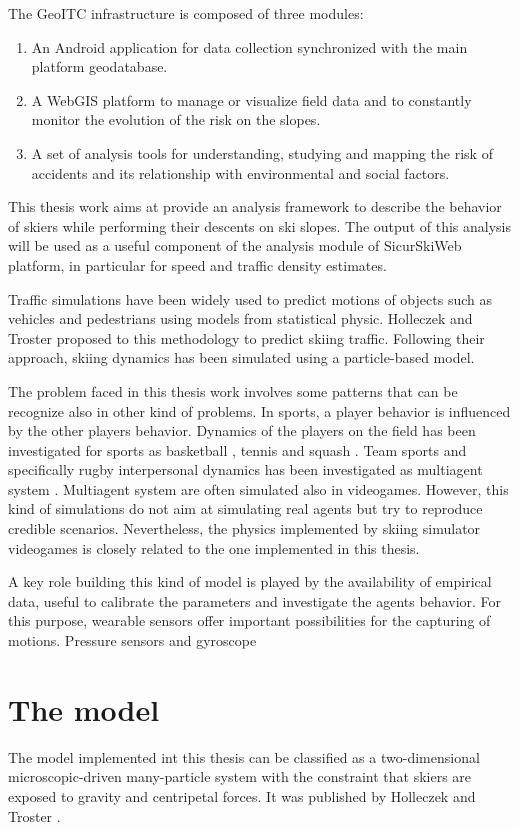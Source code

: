 \documentclass[12pt,a4paper,twoside]{book}
\begin{document}
The GeoITC infrastructure is composed of three modules:
\begin{enumerate}
\item An Android application for data collection synchronized with the main platform geodatabase.
\item A WebGIS platform to manage or visualize field data and to constantly monitor the evolution of the risk on the slopes.
\item A set of analysis tools for understanding, studying and mapping the risk of accidents and its relationship with environmental and social factors.
\end{enumerate}
This thesis work aims at provide an analysis framework to describe the behavior of skiers while performing their descents on ski slopes. The output of this analysis will be used as a useful component of the analysis module of SicurSkiWeb platform, in particular for speed and traffic density estimates.

Traffic simulations have been widely used to predict motions of objects such as vehicles and pedestrians using models from statistical physic. Holleczek and Troster proposed to this methodology to predict skiing traffic. Following their approach, skiing dynamics has been simulated using a particle-based model.

The problem faced in this thesis work involves some patterns that can be recognize also in other kind of problems. In sports, a player behavior is influenced by the other players behavior. Dynamics of the players on the field has been investigated for sports as basketball \cite{2010}, tennis \cite{pa2005} and squash \cite{mc2006}. Team sports and specifically rugby interpersonal dynamics has been investigated as multiagent system \cite{qu2009}. Multiagent system are often simulated also in videogames. However, this kind of simulations do not aim at simulating real agents but try to reproduce credible scenarios. Nevertheless, the physics implemented by skiing simulator videogames is closely related to the one implemented in this thesis.

A key role building this kind of model is played by the availability of empirical data, useful to calibrate the parameters and investigate the agents behavior. For this purpose, wearable sensors offer important possibilities for the capturing of motions. Pressure sensors and gyroscope 

\chapter{The model}\label{model}
The model implemented int this thesis can be classified as a two-dimensional microscopic-driven many-particle system with the constraint that skiers are exposed to gravity and centripetal forces. It was published by Holleczek and Troster \cite{hol2012}.
\end{document}

